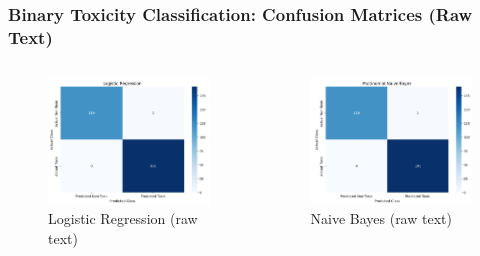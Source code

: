 \documentclass[aspectratio=169,xcolor=dvipsnames]{beamer}
\begin{document}
\begin{frame}
\frametitle{Binary Toxicity Classification: Confusion Matrices (Raw Text)}

\begin{columns}[c]
\begin{column}{0.5\textwidth}
\begin{figure}
\centering
\includegraphics[width=\linewidth]{figures/confusion_lr_no_pre.png}
\caption{Logistic Regression (raw text)}
\end{figure}
\end{column}

\begin{column}{0.5\textwidth}
\begin{figure}
\centering
\includegraphics[width=\linewidth]{figures/confusion_nb_no_pre.png}
\caption{Naive Bayes (raw text)}
\end{figure}
\end{column}
\end{columns}

\end{frame}
\end{document}
